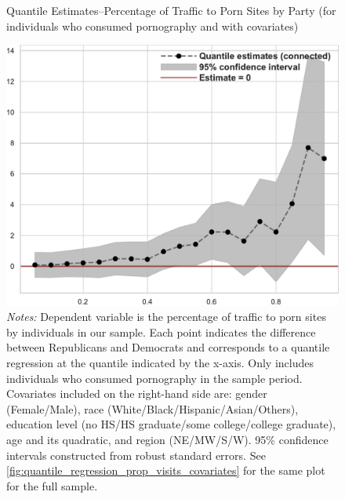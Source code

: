 \documentclass[12pt, letterpaper]{article}
\begin{document}
\begin{figure}
	\centering
	\caption{Quantile Estimates--Percentage of Traffic to Porn Sites by Party (for individuals who consumed pornography and with covariates)}
	\includegraphics[width=.55\linewidth]{../figs/quantile_reg_nonzero_covariates_proportion_visits_adult.pdf}
	\caption*{\footnotesize \emph{Notes:} 
		Dependent variable is the percentage of traffic to porn sites by individuals in our sample.
		Each point indicates the difference between Republicans and Democrats and corresponds to a quantile regression at the quantile indicated by the x-axis.
		Only includes individuals who consumed pornography in the sample period.
		Covariates included on the right-hand side are: gender (Female/Male), race (White/Black/Hispanic/Asian/Others), education level (no HS/HS graduate/some college/college graduate), age and its quadratic, and region (NE/MW/S/W).
		95\% confidence intervals constructed from robust standard errors.
		See \cref{fig:quantile_regression_prop_visits_covariates} for the same plot for the full sample.
	}
	\label{fig:quantile_regression_prop_visits_nonzeroes_covariates}
\end{figure}
\end{document}
